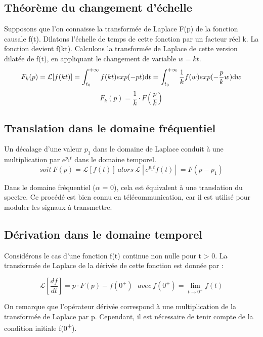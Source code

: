	\subsection{Théorème du changement d'échelle}
	
	Supposons que l'on connaisse la transformée de Laplace F(p) de la
	fonction causale f(t). Dilatons l'échelle de temps de cette fonction par
	un facteur réel k. La fonction devient f(kt). Calculons la transformée
	de Laplace de cette version dilatée de f(t), en appliquant le changement
	de variable $w = kt$.
	\begin{equation*}
	F_{k}(p) = \mathcal{L}[f(kt)]=\int_{t_{0}}^{+\infty}f(kt)exp(-pt) \mathrm{d} t  =\int_{t_{0}}^{+\infty}\frac{1}{k}f(w)exp(-\frac{p}{k}w) \mathrm{d} w 
	\end{equation*}
	\begin{equation}\label{}
	F_{k}(p) = \frac{1}{k}\cdot F(\frac{p}{k})
	\end{equation}
	
	
	\subsection{Translation dans le domaine fréquentiel}
	Un décalage d'une valeur $p_{1}$ dans le domaine de Laplace conduit à une multiplication par $e^{p_{1}t}$ dans le domaine temporel.
	\begin{equation}\label{key}
		soit~F(p)=\mathcal{L}[f(t)]~alors~\mathcal{L}[e^{p_{1}t}f(t)] = F(p-p_{1})	
	\end{equation}
	
	Dans le domaine fréquentiel ($\alpha$ = 0), cela est équivalent à une translation du spectre. Ce procédé est bien connu en télécommunication, car il est utilisé pour moduler les signaux à transmettre.
	
	
	
	\subsection{Dérivation dans le domaine temporel}
	Considérons le cas d'une fonction f(t) continue non nulle pour t > 0. La transformée de Laplace de la dérivée de cette fonction est donnée par :
	
	\begin{equation}\label{key}
	\mathcal{L}[\frac{df}{dt}] = p\cdot F(p)-f(0^{+}) ~~~avec~f(0^{+})=\lim_{t\rightarrow0^{+}}f(t)
	\end{equation}

	On remarque que l'opérateur dérivée correspond à une multiplication de
	la transformée de Laplace par p. Cependant, il est nécessaire de tenir
	compte de la condition initiale f(0\textsuperscript{+}).
	

